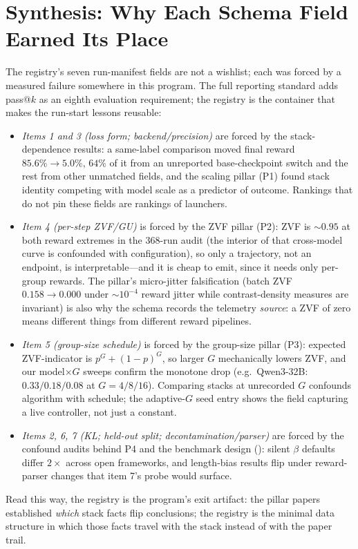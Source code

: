 \section{Synthesis: Why Each Schema Field Earned Its Place}
\label{sec:p6-synthesis}

The registry's seven run-manifest fields are not a wishlist; each was forced by
a measured failure somewhere in this program. The full reporting standard adds
pass@$k$ as an eighth evaluation requirement; the registry is the container that
makes the run-start lessons reusable:

\begin{itemize}[leftmargin=1.5em, itemsep=0.15em]
  \item \emph{Items 1 and 3 (loss form; backend/precision)} are forced by the
        stack-dependence results: a same-label comparison moved final reward
        $85.6\% \to 5.0\%$, $64\%$ of it from an unreported base-checkpoint
        switch and the rest from other unmatched fields,
        and the scaling pillar (P1) found stack identity
        competing with model scale as a predictor of outcome. Rankings that do
        not pin these fields are rankings of launchers.
  \item \emph{Item 4 (per-step ZVF/GU)} is forced by the ZVF pillar (P2): ZVF
        is ${\sim}0.95$ at both reward extremes in the 368-run audit (the
        interior of that cross-model curve is confounded with configuration),
        so only a trajectory, not an endpoint, is interpretable---and it is cheap to emit, since it needs
        only per-group rewards. The pillar's micro-jitter falsification
        (batch ZVF $0.158 \to 0.000$ under $\sim$$10^{-4}$ reward jitter while
        contrast-density measures are invariant) is also why the schema
        records the telemetry \emph{source}: a ZVF of zero means different
        things from different reward pipelines.
  \item \emph{Item 5 (group-size schedule)} is forced by the group-size pillar
        (P3): expected ZVF-indicator is $p^G + (1-p)^G$, so larger $G$
        mechanically lowers ZVF, and our model$\times G$ sweeps confirm the
        monotone drop (e.g.\ Qwen3-32B: $0.33/0.18/0.08$ at $G{=}4/8/16$).
        Comparing stacks at unrecorded $G$ confounds algorithm with schedule;
        the adaptive-$G$ seed entry shows the field capturing a live
        controller, not just a constant.
  \item \emph{Items 2, 6, 7 (KL; held-out split; decontamination/parser)} are
        forced by the confound audits behind P4 and the benchmark design
        (): silent $\beta$ defaults differ $2\times$
        across open frameworks, and length-bias results flip under
        reward-parser changes that item 7's probe would surface.
\end{itemize}

Read this way, the registry is the program's exit artifact: the pillar papers
established \emph{which} stack facts flip conclusions; the registry is the
minimal data structure in which those facts travel with the stack instead of
with the paper trail.
